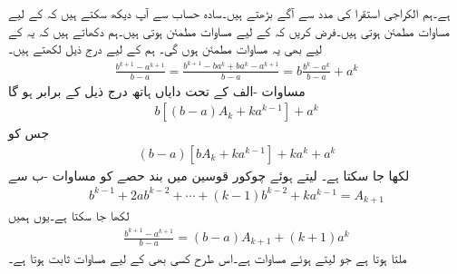 ہے۔ہم الکراجی استقرا کی مدد سے آگے بڑھتے ہیں۔سادہ حساب سے آپ دیکھ سکتے ہیں کہ  کے لیے مساوات  مطمئن ہوتی ہیں۔فرض کریں کہ  کے لیے مساوات  مطمئن ہوتی ہیں۔ہم دکھاتے ہیں کہ یہ  کے لیے بھی یہ مساوات مطمئن ہوں گی۔ ہم  کے لیے درج ذیل لکھتے ہیں۔
\begin{align*}
\frac{b^{k+1}-a^{k+1}}{b-a}=\frac{b^{k+1}-ba^k+ba^k-a^{k+1}}{b-a}=b\frac{b^k-a^k}{b-a}+a^k
\end{align*}
مساوات -الف کے تحت دایاں ہاتھ درج ذیل کے برابر ہو گا
\begin{align*}
b[(b-a)A_k+ka^{k-1}]+a^k
\end{align*}
جس کو
\begin{align*}
(b-a)[bA_k+ka^{k-1}]+ka^k+a^k
\end{align*}
لکھا جا سکتا ہے۔ لیتے ہوئے  چوکور قوسین میں بند حصے  کو مساوات -ب سے 
\begin{align*}
b^{k-1}+2ab^{k-2}+\cdots+(k-1)b^{k-2}+ka^{k-1}=A_{k+1}
\end{align*}
لکھا جا سکتا ہے۔یوں ہمیں
\begin{align*}
\frac{b^{k+1}-a^{k+1}}{b-a}=(b-a)A_{k+1}+(k+1)a^k
\end{align*}
ملتا ہوتا ہے جو  لیتے ہوئے مساوات  ہے۔اس طرح کسی بھی  کے لیے مساوات  ثابت ہوتا ہے۔

